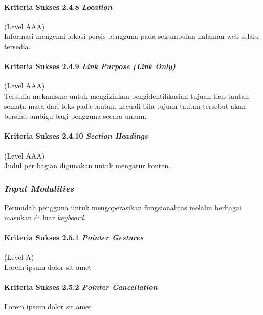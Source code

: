 \paragraph{Kriteria Sukses 2.4.8 \textit{Location}}
\label{sec:kriteria_sukses_2.4.8}
(Level AAA)\\

Informasi mengenai lokasi persis pengguna pada sekumpulan halaman web selalu tersedia.

\paragraph{Kriteria Sukses 2.4.9 \textit{Link Purpose (Link Only)}}
\label{sec:kriteria_sukses_2.4.9}
(Level AAA)\\

Tersedia mekanisme untuk mengizinkan pengidentifikasian tujuan tiap tautan semata-mata dari teks pada tautan, kecuali bila tujuan tautan tersebut akan bersifat ambigu bagi pengguna secara umum.

\paragraph{Kriteria Sukses 2.4.10 \textit{Section Headings}}
\label{sec:kriteria_sukses_2.4.10}
(Level AAA)\\

Judul per bagian digunakan untuk mengatur konten.

\subsubsection{\textit{Input Modalities}}
\label{sec:input_modalities}
Permudah pengguna untuk mengoperasikan fungsionalitas melalui berbagai masukan di luar \textit{keyboard}.

\paragraph{Kriteria Sukses 2.5.1 \textit{Pointer Gestures}}
\label{sec:kriteria_sukses_2.5.1}
(Level A)\\

Lorem ipsum dolor sit amet

\paragraph{Kriteria Sukses 2.5.2 \textit{Pointer Cancellation}}
\label{sec:kriteria_sukses_2.5.2}
Lorem ipsum dolor sit amet

